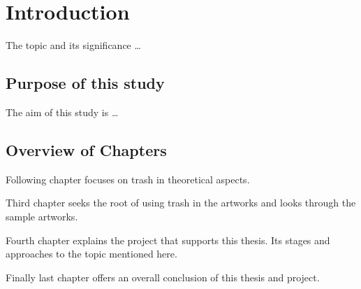 \chapter{Introduction}




The topic and its significance \ldots

\section{Purpose of this study}
The aim of this study is \ldots

\section{Overview of Chapters}
Following chapter focuses on trash in theoretical aspects.

Third chapter seeks the root of using trash in the artworks and looks through the sample artworks.

Fourth chapter explains the project that supports this thesis. Its stages and approaches to the topic mentioned here.

Finally last chapter offers an overall conclusion of this thesis and project.






